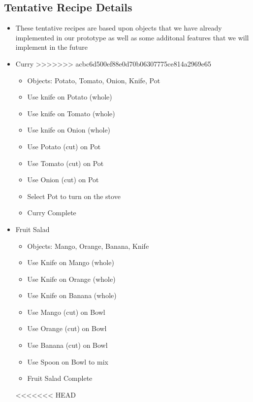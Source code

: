 \documentclass[11pt]{article}
\begin{document}
\subsection*{Tentative Recipe Details}
\label{sec:orgcd3a2e4}
\begin{itemize}
\item These tentative recipes are based upon objects that we have already implemented in our prototype as well as some additonal features that we will implement in the future

\item Curry
>>>>>>> acbc6d500ef88e0d70b06307775ce814a2969e65
\begin{itemize}
\item Objects: Potato, Tomato, Onion, Knife, Pot
\item Use knife on Potato (whole)
\item Use knife on Tomato (whole)
\item Use knife on Onion (whole)
\item Use Potato (cut) on Pot
\item Use Tomato (cut) on Pot
\item Use Onion (cut) on Pot
\item Select Pot to turn on the stove
\item Curry Complete
\end{itemize}

\item Fruit Salad
\begin{itemize}
\item Objects: Mango, Orange, Banana, Knife
\item Use Knife on Mango (whole)
\item Use Knife on Orange (whole)
\item Use Knife on Banana (whole)
\item Use Mango (cut) on Bowl
\item Use Orange (cut) on Bowl
\item Use Banana (cut) on Bowl
\item Use Spoon on Bowl to mix
\item Fruit Salad Complete
\end{itemize}

<<<<<<< HEAD

\end{itemize}
\end{document}
